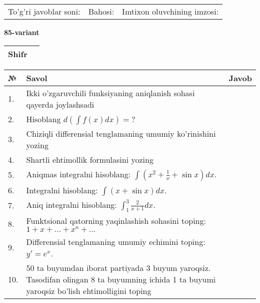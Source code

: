 \documentclass{article}
\begin{document}
  \vspace{1cm}
  
  \begin{tabular}{lll}
  To'g'ri javoblar soni: \underline{\hspace{1.5cm}} & 
  Bahosi: \underline{\hspace{1.5cm}} & 
  Imtixon oluvchining imzosi: \underline{\hspace{2cm}} \\
  \end{tabular}
  
  \egroup
  
  \newpage
  
  
  \textbf{85-variant}\\
  
  \bgroup
  \def\arraystretch{1.6} %
  
  \begin{tabular}{|m{5.7cm}|m{9.5cm}|}
  \hline
  Shifr & \\
  \hline
  \end{tabular}
  
  \vspace{1cm}
  
  \begin{tabular}{|m{0.7cm}|m{10cm}|m{4cm}|}
  \hline
  № & Savol & Javob \\
  \hline
  1. & Ikki o'zgaruvchili funksiyaning aniqlanish sohasi qayerda joylashsadi &  \\
  \hline
  2. & Hisoblang \(d\left( \int {f(x)dx} \right) = ?\) &  \\
  \hline
  3. & Chiziqli differensial tenglamaning umumiy ko'rinishini yozing &  \\
  \hline
  4. & Shartli ehtimollik formulasini yozing &  \\
  \hline
  5. & Aniqmas integralni hisoblang: \(\int {\left( x^{2} + \frac{1}{x} + \sin x \right)dx}\). &  \\
  \hline
  6. & Integralni hisoblang: \(\int {(x + \sin x)dx}\). &  \\
  \hline
  7. & Aniq integralni hisoblang: \(\int_{1}^{3}\frac{2}{x + 1}dx\). &  \\
  \hline
  8. & Funktsional qatorning yaqinlashish sohasini toping:\(1 + x + ... + x^{n} + ...\) &  \\
  \hline
  9. & Differensial tenglamaning umumiy echimini toping: \(y' = e^{x}\). &  \\
  \hline
  10. & 50 ta buyumdan iborat partiyada 3 buyum yaroqsiz. Tasodifan olingan 8 ta buyumning ichida 1 ta buyumi yaroqsiz bo'lish ehtimolligini toping &  \\
  \hline
  \end{tabular}
  
\end{document}
